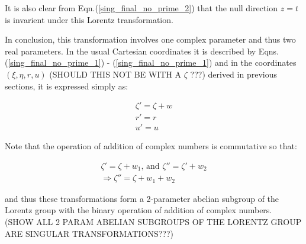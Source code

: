\noindent It is also clear from Eqn.(\ref{sing_final_no_prime_2}) that the null direction $z = t$ is invarient under this Lorentz transformation.

In conclusion, this transformation involves one complex parameter and thus two real parameters. In the usual Cartesian coordinates it is described by Eqns.(\ref{sing_final_no_prime_1}) - (\ref{sing_final_no_prime_1}) and in the coordinates $(\xi, \eta, r, u)$ (SHOULD THIS NOT BE WITH A $\zeta$ ???) derived in previous sections, it is expressed simply as:

\begin{eqnarray*}
\zeta' = \zeta + w \\
r' = r \\
u' = u
\end{eqnarray*}

Note that the operation of addition of complex numbers is commutative so that:

\begin{eqnarray*} 
\zeta' = \zeta + w_1 \text{, and } \zeta'' = \zeta' + w_2 \\
\Rightarrow \zeta'' = \zeta + w_1 + w_2
\end{eqnarray*} 
 
\noindent and thus these transformations form a 2-parameter abelian subgroup of the Lorentz group with the binary operation of addition of complex numbers. (SHOW ALL 2 PARAM ABELIAN SUBGROUPS OF THE LORENTZ GROUP ARE SINGULAR TRANSFORMATIONS???)






